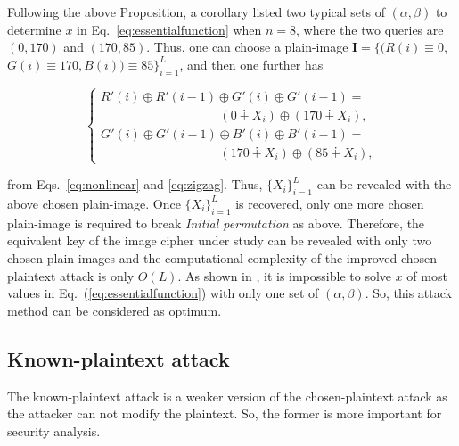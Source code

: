 \documentclass{ws-ijbc}
\begin{document}
Following the above Proposition, a corollary listed two typical sets of $(\alpha, \beta)$
to determine $x$ in Eq.~\eqref{eq:essentialfunction} when $n=8$, where
the two queries are $(0,170)$ and $(170,85)$. Thus, one can choose a plain-image
$\mathbf{I} =\{(R(i)\equiv 0$,
$G(i)\equiv 170, B(i))\equiv 85\}_{i=1}^{L}$, and then one further has
\begin{linenomath}
\begin{equation}
\nonumber
\begin{cases}
R'(i) \oplus R'(i-1) \oplus G'(i) \oplus G'(i-1) =  \\
\hspace{4cm}\left(0 \dotplus X_{i}\right)
 \oplus \left(170 \dotplus X_{i}\right),\\
G'(i) \oplus G'(i-1) \oplus B'(i) \oplus B'(i-1) =  \\
\hspace{4cm} \left(170 \dotplus X_{i}\right)
\oplus \left(85 \dotplus X_{i}\right),
\end{cases}
\end{equation}
\end{linenomath}
from Eqs.~\eqref{eq:nonlinear} and \eqref{eq:zigzag}.
Thus, $\{X_{i}\}_{i=1}^{L}$ can be revealed with the above chosen plain-image.
Once $\{X_{i}\}_{i=1}^{L}$ is recovered,
only one more chosen plain-image is required to break \textit{ Initial permutation} as above. Therefore, the equivalent key of
the image cipher under study can be revealed with only two chosen plain-images and the computational complexity of
the improved chosen-plaintext attack is only $O(L)$. As shown in \cite{Cqli:breakmodulo:IJBC13}, it is impossible to
solve $x$ of most values in Eq.~(\ref{eq:essentialfunction}) with only one set of $(\alpha, \beta)$. So, this attack method can be considered
as optimum.

\subsection{Known-plaintext attack}
\label{ssec:kpa}

The known-plaintext attack is a weaker version of the chosen-plaintext attack
as the attacker can not modify the plaintext. So, the former is more important for security analysis.
\end{document}
